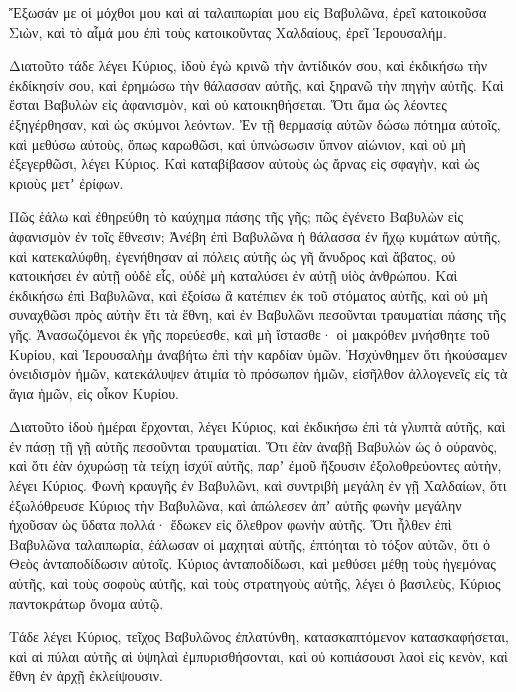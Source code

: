{Ἔξωσάν με οἱ μόχθοι μου καὶ αἱ ταλαιπωρίαι μου εἰς Βαβυλῶνα, ἐρεῖ κατοικοῦσα Σιὼν, καὶ τὸ αἷμά μου ἐπὶ τοὺς κατοικοῦντας Χαλδαίους, ἐρεῖ Ἱερουσαλήμ.
\par }{\PP {}Διατοῦτο τάδε λέγει Κύριος, ἰδοὺ ἐγὼ κρινῶ τὴν ἀντίδικόν σου, καὶ ἐκδικήσω τὴν ἐκδίκησίν σου, καὶ ἐρημώσω τὴν θάλασσαν αὐτῆς, καὶ ξηρανῶ τὴν πηγὴν αὐτῆς.
Καὶ ἔσται Βαβυλὼν εἰς ἀφανισμὸν, καὶ οὐ κατοικηθήσεται.
Ὅτι ἅμα ὡς λέοντες ἐξηγέρθησαν, καὶ ὡς σκύμνοι λεόντων.
Ἐν τῇ θερμασίᾳ αὐτῶν δώσω πότημα αὐτοῖς, καὶ μεθύσω αὐτοὺς, ὅπως καρωθῶσι, καὶ ὑπνώσωσιν ὕπνον αἰώνιον, καὶ οὐ μὴ ἐξεγερθῶσι, λέγει Κύριος.
Καὶ καταβίβασον αὐτοὺς ὡς ἄρνας εἰς σφαγὴν, καὶ ὡς κριοὺς μετʼ ἐρίφων.
\par }{\PP {}Πῶς ἑάλω καὶ ἐθηρεύθη τὸ καύχημα πάσης τῆς γῆς; πῶς ἐγένετο Βαβυλὼν εἰς ἀφανισμὸν ἐν τοῖς ἔθνεσιν;
Ἀνέβη ἐπὶ Βαβυλῶνα ἡ θάλασσα ἐν ἤχῳ κυμάτων αὐτῆς, καὶ κατεκαλύφθη,
ἐγενήθησαν αἱ πόλεις αὐτῆς ὡς γῆ ἄνυδρος καὶ ἄβατος, οὐ κατοικήσει ἐν αὐτῇ οὐδὲ εἷς, οὐδὲ μὴ καταλύσει ἐν αὐτῇ υἱὸς ἀνθρώπου.
Καὶ ἐκδικήσω ἐπὶ Βαβυλῶνα, καὶ ἐξοίσω ἃ κατέπιεν ἐκ τοῦ στόματος αὐτῆς, καὶ οὐ μὴ συναχθῶσι πρὸς αὐτὴν ἔτι τὰ ἔθνη,
καὶ ἐν Βαβυλῶνι πεσοῦνται τραυματίαι πάσης τῆς γῆς.
Ἀνασωζόμενοι ἐκ γῆς πορεύεσθε, καὶ μὴ ἵστασθε· οἱ μακρόθεν μνήσθητε τοῦ Κυρίου, καὶ Ἱερουσαλὴμ ἀναβήτω ἐπὶ τὴν καρδίαν ὑμῶν.
Ἠσχύνθημεν ὅτι ἠκούσαμεν ὀνειδισμὸν ἡμῶν, κατεκάλυψεν ἀτιμία τὸ πρόσωπον ἡμῶν, εἰσῆλθον ἀλλογενεῖς εἰς τὰ ἅγια ἡμῶν, εἰς οἶκον Κυρίου.
\par }{\PP {}Διατοῦτο ἰδοὺ ἡμέραι ἔρχονται, λέγει Κύριος, καὶ ἐκδικήσω ἐπὶ τὰ γλυπτὰ αὐτῆς, καὶ ἐν πάσῃ τῇ γῇ αὐτῆς πεσοῦνται τραυματίαι.
Ὅτι ἐὰν ἀναβῇ Βαβυλὼν ὡς ὁ οὐρανὸς, καὶ ὅτι ἐὰν ὀχυρώσῃ τὰ τείχη ἰσχύϊ αὐτῆς, παρʼ ἐμοῦ ἥξουσιν ἐξολοθρεύοντες αὐτὴν, λέγει Κύριος.
Φωνὴ κραυγῆς ἐν Βαβυλῶνι, καὶ συντριβὴ μεγάλη ἐν γῇ Χαλδαίων,
ὅτι ἐξωλόθρευσε Κύριος τὴν Βαβυλῶνα, καὶ ἀπώλεσεν ἀπʼ αὐτῆς φωνὴν μεγάλην ἠχοῦσαν ὡς ὕδατα πολλά· ἔδωκεν εἰς ὄλεθρον φωνὴν αὐτῆς.
Ὅτι ἦλθεν ἐπὶ Βαβυλῶνα ταλαιπωρία, ἑάλωσαν οἱ μαχηταὶ αὐτῆς, ἐπτόηται τὸ τόξον αὐτῶν, ὅτι ὁ Θεὸς ἀνταποδίδωσιν αὐτοῖς.
Κύριος ἀνταποδίδωσι, καὶ μεθύσει μέθῃ τοὺς ἡγεμόνας αὐτῆς, καὶ τοὺς σοφοὺς αὐτῆς, καὶ τοὺς στρατηγοὺς αὐτῆς, λέγει ὁ βασιλεὺς, Κύριος παντοκράτωρ ὄνομα αὐτῷ.
\par }{\PP {}Τάδε λέγει Κύριος, τεῖχος Βαβυλῶνος ἐπλατύνθη, κατασκαπτόμενον κατασκαφήσεται, καὶ αἱ πύλαι αὐτῆς αἱ ὑψηλαὶ ἐμπυρισθήσονται, καὶ οὐ κοπιάσουσι λαοὶ εἰς κενὸν, καὶ ἔθνη ἐν ἀρχῇ ἐκλείψουσιν.
}
